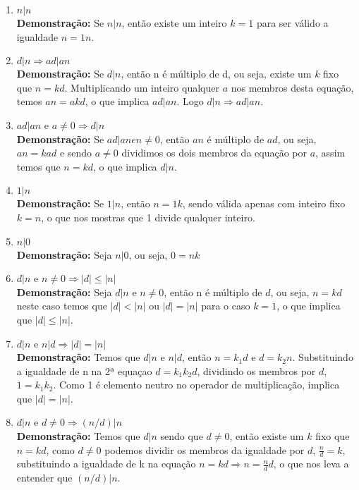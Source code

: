 \begin{enumerate}[label=(\roman*)]
	\item $n|n$ \\ \textbf{Demonstração:} Se $n|n$, então existe um inteiro $k = 1$ para ser válido a igualdade $n = 1n$.
	\item $d|n \Rightarrow ad | an$ \\ \textbf{Demonstração:} Se $d|n$, então n é múltiplo de d, ou seja, existe um $k$ fixo que $n = kd$. Multiplicando um inteiro qualquer $a$ nos membros desta equação, temos $an = akd$, o que implica $ad | an$. Logo $d|n \Rightarrow ad|an$.
	\item $ad|an$ e $a \neq 0 \Rightarrow d|n$ \\ \textbf{Demonstração:} Se $ad|an e n \neq 0$, então $an$ é múltiplo de $ad$, ou seja, $an = kad$ e sendo $a \neq 0$ dividimos os dois membros da equação por $a$, assim temos que $n = kd$, o que implica $d|n$.
	\item $1|n$ \\ \textbf{Demonstração:} Se $1|n$, então $n = 1k$, sendo válida apenas com inteiro fixo $k = n$, o que nos mostras que 1 divide qualquer inteiro.
	\item $n|0$ \\ \textbf{Demonstração:} Seja $n|0$, ou seja, $0 = nk$ 
	\item $d|n$ e $n \neq 0 \Rightarrow |d| \leq |n|$ \\ \textbf{Demonstração:} Seja $d|n$ e $n \neq 0$, então n é múltiplo de $d$, ou seja, $n = kd$ neste caso temos que $|d| < |n|$ ou $|d| = |n|$ para o caso $k=1$, o que implica que $|d| \leq |n|$.
	\item $d|n$ e $n|d \Rightarrow |d| = |n|$ \\ \noindent\textbf{Demonstração:} Temos que $d|n$ e $n|d$, então $n = k_1d$ e $d = k_2n$. Substituindo a igualdade de n na 2ª equaçao $d=k_1k_2d$, dividindo os membros por $d$, $1=k_1k_2$. Como 1 é elemento neutro no operador de multiplicação, implica que $|d| = |n|$.
	\item $d|n$ e $d \neq 0 \Rightarrow (n/d)|n$ \\ \textbf{Demonstração:} Temos que $d|n$ sendo que $d \neq 0$, então existe um $k$ fixo que $n = kd$, como $d \neq 0$ podemos dividir os membros da igualdade por $d$, $\frac{n}{d} = k$, substituindo a igualdade de k na equação $n = kd \Rightarrow n = \frac{n}{d}d$, o que nos leva a entender que $(n/d)|n$.
\end{enumerate}

